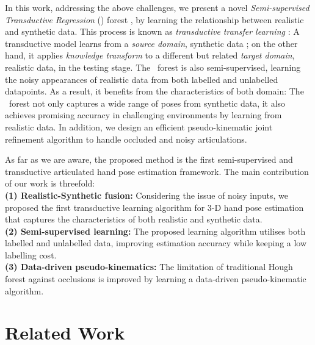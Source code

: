 In this work, 
addressing the above challenges, 
we present a novel \emph{Semi-supervised Transductive Regression} (\STR) forest
, by learning the relationship between realistic and synthetic data. 
This process is known as \emph{transductive transfer learning} \cite{Pan_TKDE_10}:   
A transductive model learns from a \emph{source domain}, \eg synthetic data
; on the other hand, it applies \emph{knowledge transform} to a different but related \emph{target domain}, \eg realistic data, in the testing stage. 
The \STR\ forest is also semi-supervised, learning the noisy appearances of realistic data from both labelled and unlabelled datapoints. As a result, it benefits from the characteristics of both domain: The \STR\ forest not only captures a wide range of poses from synthetic data, it also achieves promising accuracy in challenging environments by learning from realistic data. 
In addition, we design an efficient pseudo-kinematic joint refinement algorithm to 
handle occluded and noisy
articulations. 

As far as we are aware, the proposed method is the first semi-supervised and transductive articulated hand pose estimation framework.  
The main contribution of our work is threefold:\\ 
\textbf{(1) Realistic-Synthetic fusion:} Considering the issue of noisy inputs, we proposed the first transductive learning algorithm for 3-D hand pose estimation that captures the characteristics of both realistic and synthetic data.\\
\textbf{(2) Semi-supervised learning:} The proposed learning algorithm utilises both labelled and unlabelled data, improving estimation accuracy while keeping a low labelling cost.  \\
\textbf{(3) Data-driven pseudo-kinematics:} The limitation of traditional Hough forest\cite{Gall_CVPR_09} against occlusions is improved by learning a data-driven pseudo-kinematic algorithm.


\section{Related Work}

